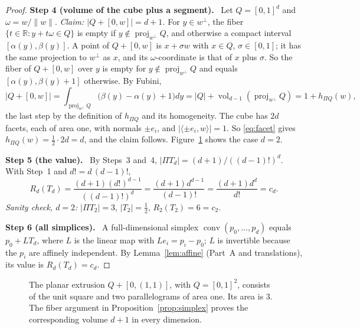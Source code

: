 \documentclass[11pt]{article}
\newcommand{\R}{\mathbb R}
\DeclareMathOperator{\conv}{conv}
\DeclareMathOperator{\vol}{vol}
\DeclareMathOperator{\proj}{proj}
\newcommand{\step}[1]{\par\smallskip\noindent\textbf{#1}\ }
\begin{document}
\begin{proof}
\step{Step 4 (volume of the cube plus a segment).} Let \(Q=[0,1]^d\)
and \(\omega=w/\|w\|\). \emph{Claim: \(|Q+[0,w]|=d+1\).} For
\(y\in w^\perp\), the fiber \(\{t\in\R:y+t\omega\in Q\}\) is empty if
\(y\notin\proj_{w^\perp}Q\), and otherwise a compact interval
\([\alpha(y),\beta(y)]\). A point of \(Q+[0,w]\) is \(x+\sigma w\) with
\(x\in Q\), \(\sigma\in[0,1]\); it has the same projection to
\(w^\perp\) as \(x\), and its \(\omega\)-coordinate is that of \(x\)
plus \(\sigma\). So the fiber of \(Q+[0,w]\) over \(y\) is empty
for \(y\notin\proj_{w^\perp}Q\) and equals
\([\alpha(y),\beta(y)+1]\) otherwise. By Fubini,
\[
 |Q+[0,w]|
 =\int_{\proj_{w^\perp}Q}\bigl(\beta(y)-\alpha(y)+1\bigr)dy
 =|Q|+\vol_{d-1}(\proj_{w^\perp}Q)
 =1+h_{\Pi Q}(w),
\]
the last step by the definition of \(h_{\Pi Q}\) and its homogeneity.
The cube has \(2d\) facets, each of area one, with normals \(\pm e_i\),
and \(|\langle\pm e_i,w\rangle|=1\). So \eqref{eq:facet} gives
\(h_{\Pi Q}(w)=\tfrac12\cdot2d=d\), and the claim follows.
Figure~\ref{fig:extrusion} shows the case \(d=2\).

\step{Step 5 (the value).} By Steps~3 and~4,
\(|\Pi T_d|=(d+1)/((d-1)!)^d\). With Step~1 and \(d!=d\,(d-1)!\),
\[
 R_d(T_d)=\frac{(d+1)(d!)^{d-1}}{((d-1)!)^d}
 =\frac{(d+1)d^{d-1}}{(d-1)!}
 =\frac{(d+1)d^d}{d!}=c_d.
\]
\emph{Sanity check, \(d=2\):} \(|\Pi T_2|=3\), \(|T_2|=\tfrac12\),
\(R_2(T_2)=6=c_2\).

\step{Step 6 (all simplices).} A full-dimensional simplex
\(\conv(p_0,\ldots,p_d)\) equals \(p_0+LT_d\), where \(L\) is the linear
map with \(Le_i=p_i-p_0\); \(L\) is invertible because the \(p_i\) are
affinely independent. By Lemma~\ref{lem:affine} (Part~A and
translations), its value is \(R_d(T_d)=c_d\).
\end{proof}

\begin{figure}[tb]
\centering
{}
\caption{The planar extrusion \(Q+[0,(1,1)]\), with
\(Q=[0,1]^2\), consists of the unit square and two parallelograms of
area one. Its area is \(3\). The fiber argument in
Proposition~\ref{prop:simplex} proves the corresponding volume \(d+1\)
in every dimension.}
\label{fig:extrusion}
\end{figure}
\end{document}
